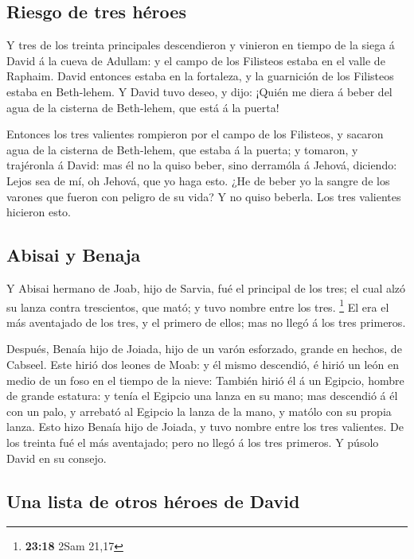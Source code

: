 \hypertarget{riesgo-de-tres-huxe9roes}{%
\subsection{Riesgo de tres héroes}\label{riesgo-de-tres-huxe9roes}}

 Y tres de los treinta principales descendieron y vinieron
en tiempo de la siega á David á la cueva de Adullam: y el campo de los
Filisteos estaba en el valle de Raphaim.  David entonces
estaba en la fortaleza, y la guarnición de los Filisteos estaba en
Beth-lehem.  Y David tuvo deseo, y dijo: ¡Quién me diera á
beber del agua de la cisterna de Beth-lehem, que está á la puerta!

 Entonces los tres valientes rompieron por el campo de los
Filisteos, y sacaron agua de la cisterna de Beth-lehem, que estaba á la
puerta; y tomaron, y trajéronla á David: mas él no la quiso beber, sino
derramóla á Jehová, diciendo:  Lejos sea de mí, oh Jehová,
que yo haga esto. ¿He de beber yo la sangre de los varones que fueron
con peligro de su vida? Y no quiso beberla. Los tres valientes hicieron
esto.

\hypertarget{abisai-y-benaja}{%
\subsection{Abisai y Benaja}\label{abisai-y-benaja}}

 Y Abisai hermano de Joab, hijo de Sarvia, fué el principal
de los tres; el cual alzó su lanza contra trescientos, que mató; y tuvo
nombre entre los tres. \footnote{\textbf{23:18} 2Sam 21,17}
 El era el más aventajado de los tres, y el primero de
ellos; mas no llegó á los tres primeros.

 Después, Benaía hijo de Joiada, hijo de un varón
esforzado, grande en hechos, de Cabseel. Este hirió dos leones de Moab:
y él mismo descendió, é hirió un león en medio de un foso en el tiempo
de la nieve:  También hirió él á un Egipcio, hombre de
grande estatura: y tenía el Egipcio una lanza en su mano; mas descendió
á él con un palo, y arrebató al Egipcio la lanza de la mano, y matólo
con su propia lanza.  Esto hizo Benaía hijo de Joiada, y
tuvo nombre entre los tres valientes.  De los treinta fué
el más aventajado; pero no llegó á los tres primeros. Y púsolo David en
su consejo.

\hypertarget{una-lista-de-otros-huxe9roes-de-david}{%
\subsection{Una lista de otros héroes de
David}\label{una-lista-de-otros-huxe9roes-de-david}}

